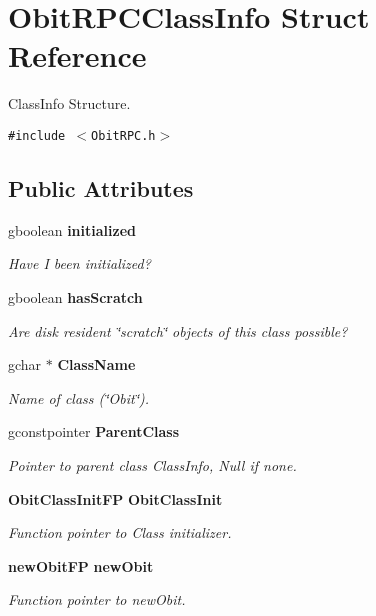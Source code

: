 \section{Obit\-RPCClass\-Info Struct Reference}
\label{structObitRPCClassInfo}
Class\-Info Structure.  


{\tt \#include $<$Obit\-RPC.h$>$}

\subsection*{Public Attributes}
\begin{CompactItemize}
\item 
gboolean {\bf initialized}
\begin{CompactList}\small\item\em Have I been initialized? \item\end{CompactList}\item 
gboolean {\bf has\-Scratch}
\begin{CompactList}\small\item\em Are disk resident \char`\"{}scratch\char`\"{} objects of this class possible? \item\end{CompactList}\item 
gchar $\ast$ {\bf Class\-Name}
\begin{CompactList}\small\item\em Name of class (\char`\"{}Obit\char`\"{}). \item\end{CompactList}\item 
gconstpointer {\bf Parent\-Class}
\begin{CompactList}\small\item\em Pointer to parent class Class\-Info, Null if none. \item\end{CompactList}\item 
{\bf Obit\-Class\-Init\-FP} {\bf Obit\-Class\-Init}
\begin{CompactList}\small\item\em Function pointer to Class initializer. \item\end{CompactList}\item 
{\bf new\-Obit\-FP} {\bf new\-Obit}
\begin{CompactList}\small\item\em Function pointer to new\-Obit. \item\end{CompactList}\item 

\end{CompactItemize}
